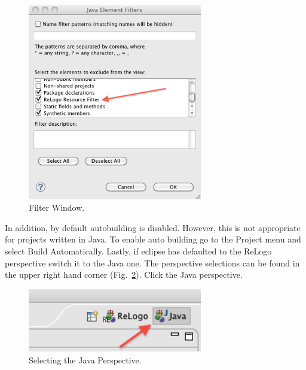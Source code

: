 \documentclass[11pt]{amsart}
\begin{document}
\begin{figure}[h]
\begin{center}
\vspace{.2in}
\centerline {
\includegraphics[width=3in]{GettingStartedImages/filter_window.png}
}
\caption{Filter Window.}
\label{fig:filter2}
\end{center}
\end{figure}
In addition, by default autobuilding is disabled. However, this is not appropriate for projects written in Java. To enable auto building go to the Project menu and select Build Automatically. Lastly, if eclipse has defaulted to the ReLogo perspective switch it to the Java one. The perspective selections can be found in the upper right hand corner (Fig.~\ref{fig:javap}). Click the Java perspective.

\begin{figure}[h]
\begin{center}
\vspace{.2in}
\centerline {
\includegraphics[width=3in]{GettingStartedImages/perspectives.png}
}
\caption{Selecting the Java Perspective.}
\label{fig:javap}
\end{center}
\end{figure}
\end{document}
